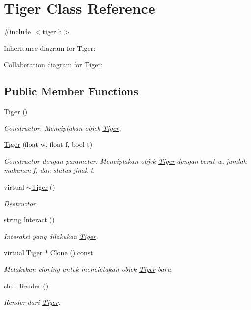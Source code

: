 \hypertarget{classTiger}{}\section{Tiger Class Reference}
\label{classTiger}


{\ttfamily \#include $<$tiger.\+h$>$}



Inheritance diagram for Tiger\+:


Collaboration diagram for Tiger\+:
\subsection*{Public Member Functions}
\begin{DoxyCompactItemize}
\item 
\hyperlink{classTiger_ab2b455a0cdbd21f2052eef2a176f0eeb}{Tiger} ()
\begin{DoxyCompactList}\small\item\em Constructor. Menciptakan objek \hyperlink{classTiger}{Tiger}. \end{DoxyCompactList}\item 
\hyperlink{classTiger_ade1e562b2af36ee2838d3bc6dc95042b}{Tiger} (float w, float f, bool t)
\begin{DoxyCompactList}\small\item\em Constructor dengan parameter. Menciptakan objek \hyperlink{classTiger}{Tiger} dengan berat w, jumlah makanan f, dan status jinak t. \end{DoxyCompactList}\item 
virtual \hyperlink{classTiger_ae9a0109993b438dd7405b4018ba62d4b}{$\sim$\+Tiger} ()
\begin{DoxyCompactList}\small\item\em Destructor. \end{DoxyCompactList}\item 
string \hyperlink{classTiger_ae318cc373300a52e13598f42368a2c70}{Interact} ()
\begin{DoxyCompactList}\small\item\em Interaksi yang dilakukan \hyperlink{classTiger}{Tiger}. \end{DoxyCompactList}\item 
virtual \hyperlink{classTiger}{Tiger} $\ast$ \hyperlink{classTiger_aa376d57a4b2d56edb586f7ba1b170037}{Clone} () const 
\begin{DoxyCompactList}\small\item\em Melakukan cloning untuk menciptakan objek \hyperlink{classTiger}{Tiger} baru. \end{DoxyCompactList}\item 
char \hyperlink{classTiger_a42b09a0bfc8c115e7383e926513fb371}{Render} ()
\begin{DoxyCompactList}\small\item\em Render dari \hyperlink{classTiger}{Tiger}. \end{DoxyCompactList}\end{DoxyCompactItemize}
